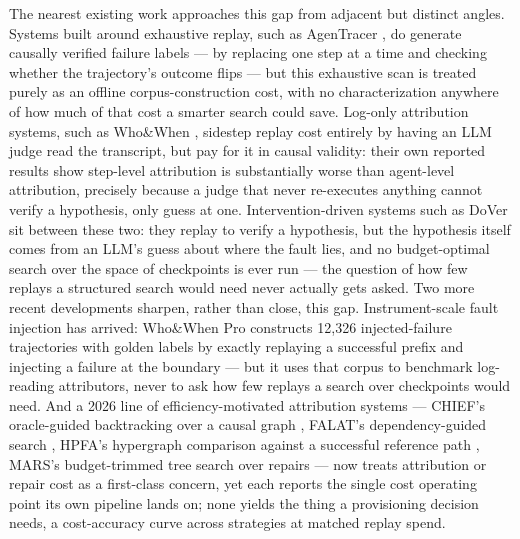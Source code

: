\documentclass[11pt]{article}
\begin{document}
The nearest existing work approaches this gap from adjacent but distinct angles. Systems built around exhaustive replay, such as AgenTracer \citep{AgenTracer2025}, do generate causally verified failure labels --- by replacing one step at a time and checking whether the trajectory's outcome flips --- but this exhaustive scan is treated purely as an offline corpus-construction cost, with no characterization anywhere of how much of that cost a smarter search could save. Log-only attribution systems, such as Who\&When \citep{WhoWhen2025}, sidestep replay cost entirely by having an LLM judge read the transcript, but pay for it in causal validity: their own reported results show step-level attribution is substantially worse than agent-level attribution, precisely because a judge that never re-executes anything cannot verify a hypothesis, only guess at one. Intervention-driven systems such as DoVer \citep{DoVer2025} sit between these two: they replay to verify a hypothesis, but the hypothesis itself comes from an LLM's guess about where the fault lies, and no budget-optimal search over the space of checkpoints is ever run --- the question of how few replays a structured search would need never actually gets asked. Two more recent developments sharpen, rather than close, this gap. Instrument-scale fault injection has arrived: Who\&When Pro \citep{WhoWhenPro2607} constructs 12{,}326 injected-failure trajectories with golden labels by exactly replaying a successful prefix and injecting a failure at the boundary --- but it uses that corpus to benchmark log-reading attributors, never to ask how few replays a search over checkpoints would need. And a 2026 line of efficiency-motivated attribution systems --- CHIEF's oracle-guided backtracking over a causal graph \citep{CHIEF2602}, FALAT's dependency-guided search \citep{FALAT2606}, HPFA's hypergraph comparison against a successful reference path \citep{HPFA2608}, MARS's budget-trimmed tree search over repairs \citep{MARS2607} --- now treats attribution or repair cost as a first-class concern, yet each reports the single cost operating point its own pipeline lands on; none yields the thing a provisioning decision needs, a cost-accuracy curve across strategies at matched replay spend.
\end{document}
